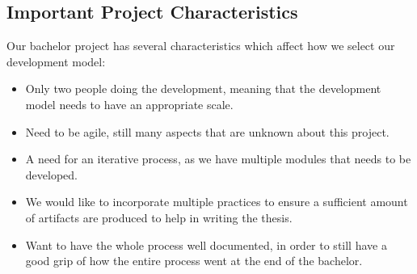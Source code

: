 \subsection{Important Project Characteristics}
Our bachelor project has several characteristics which affect how we select our development model:

\begin{itemize}
    \item 
        Only two people doing the development, meaning that the development model needs to have an appropriate scale.
    
    \item 
        Need to be agile, still many aspects that are unknown about this project.
    
    \item 
        A need for an iterative process, as we have multiple modules that needs to be developed.
    
    \item 
        We would like to incorporate multiple practices to ensure a sufficient amount of artifacts are produced to help in writing the thesis.
    
    \item 
    Want to have the whole process well documented, in order to still have a good grip of how the entire process went at the end of the bachelor. 
\end{itemize}